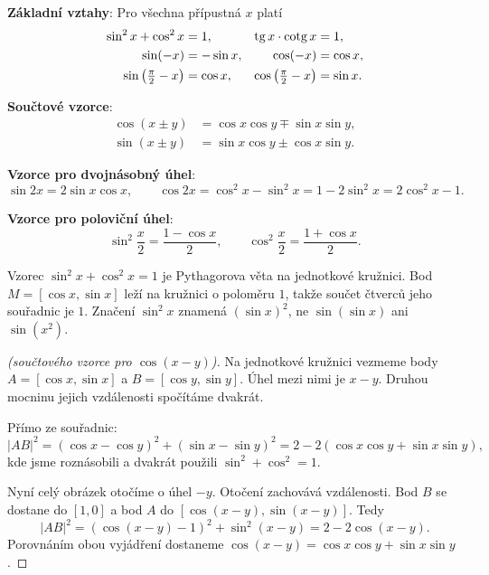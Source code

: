 \begin{definitionbox}
  \textbf{Základní vztahy}: Pro všechna přípustná $x$ platí
  \begin{align*}
    \sin^2 x + \cos^2 x &= 1, & \operatorname{tg} x\cdot\operatorname{cotg} x &= 1,\\
    \sin(-x) &= -\sin x, & \cos(-x) &= \cos x,\\
    \sin\left(\tfrac{\pi}{2} - x\right) &= \cos x, & \cos\left(\tfrac{\pi}{2} - x\right) &= \sin x.
  \end{align*}

  \textbf{Součtové vzorce}:
  \begin{align*}
    \cos(x\pm y) &= \cos x\cos y\mp\sin x\sin y,\\
    \sin(x\pm y) &= \sin x\cos y\pm\cos x\sin y.
  \end{align*}

  \textbf{Vzorce pro dvojnásobný úhel}:
  \begin{equation*}
    \sin 2x = 2\sin x\cos x,\qquad\cos 2x = \cos^2 x - \sin^2 x = 1 - 2\sin^2 x = 2\cos^2 x - 1.
  \end{equation*}

  \textbf{Vzorce pro poloviční úhel}:
  \begin{equation*}
    \sin^2\frac{x}{2} = \frac{1 - \cos x}{2},\qquad\cos^2\frac{x}{2} = \frac{1 + \cos x}{2}.
  \end{equation*}
\end{definitionbox}

Vzorec $\sin^2 x + \cos^2 x = 1$ je Pythagorova věta na jednotkové kružnici. Bod $M = [\cos x, \sin x]$ leží na kružnici o poloměru $1$, takže součet čtverců jeho souřadnic je $1$. Značení $\sin^2 x$ znamená ${(\sin x)}^2$, ne $\sin(\sin x)$ ani $\sin(x^2)$.

\begin{proof}[(součtového vzorce pro $\cos(x - y)$)]
  Na jednotkové kružnici vezmeme body $A = [\cos x, \sin x]$ a $B = [\cos y, \sin y]$. Úhel mezi nimi je $x - y$. Druhou mocninu jejich vzdálenosti spočítáme dvakrát.

  Přímo ze souřadnic:
  \begin{equation*}
    |AB|^2 = {(\cos x - \cos y)}^2 + {(\sin x - \sin y)}^2 = 2 - 2(\cos x\cos y + \sin x\sin y),
  \end{equation*}
  kde jsme roznásobili a dvakrát použili $\sin^2 + \cos^2 = 1$.

  Nyní celý obrázek otočíme o úhel $-y$. Otočení zachovává vzdálenosti. Bod $B$ se dostane do $[1, 0]$ a bod $A$ do $[\cos(x - y), \sin(x - y)]$. Tedy
  \begin{equation*}
    |AB|^2 = {(\cos(x - y) - 1)}^2 + \sin^2(x - y) = 2 - 2\cos(x - y).
  \end{equation*}
  Porovnáním obou vyjádření dostaneme $\cos(x - y) = \cos x\cos y + \sin x\sin y$.
\end{proof}


